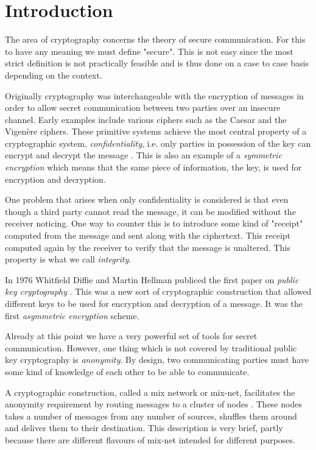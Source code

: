 \section{Introduction}

The area of cryptography concerns the theory of secure
communication. For this to have any meaning we must define
"secure". This is not easy since the most strict definition is not
practically feasible and is thus done on a case to case basis
depending on the context.

Originally cryptography was interchangeable with the encryption of
messages in order to allow secret communication between two parties
over an insecure channel. Early examples include various ciphers such
as the Caesar and the Vigenère ciphers. These primitive systems
achieve the most central property of a cryptographic system,
\emph{confidentiality}, i.e. only parties in possession of the key can
encrypt and decrypt the message \cite[p.~3]{hac}. This is also an example of a
\emph{symmetric encryption} which means that the same piece of
information, the key, is used for encryption and decryption.

One problem that arises when only confidentiality is considered is
that even though a third party cannot read the message, it can be
modified without the receiver noticing. One way to counter this is to
introduce some kind of "receipt" computed from the message and sent
along with the ciphertext. This receipt computed again by the receiver
to verify that the message is unaltered. This property is what we call
\emph{integrity}.

In 1976 Whitfield Diffie and Martin Hellman publiced the first paper
on \emph{public key cryptography} \cite[p.~2]{hac}. This was a new sort of
cryptographic construction that allowed different keys to be used for
encryption and decryption of a message. It was the first
\emph{asymmetric encryption} scheme.

Already at this point we have a very powerful set of tools for secret
communication. However, one thing which is not covered by traditional
public key cryptography is \emph{anonymity}. By design, two
communicating parties must have some kind of knowledge of each other
to be able to communicate. 

A cryptographic construction, called a mix network or mix-net,
facilitates the anonymity requirement by routing messages to a cluster
of nodes \cite[p.~1]{mixnets}. These nodes takes a number of messages
from any number of sources, shuffles them around and deliver them to
their destination. This description is very brief, partly because
there are different flavours of mix-net intended for different
purposes.

